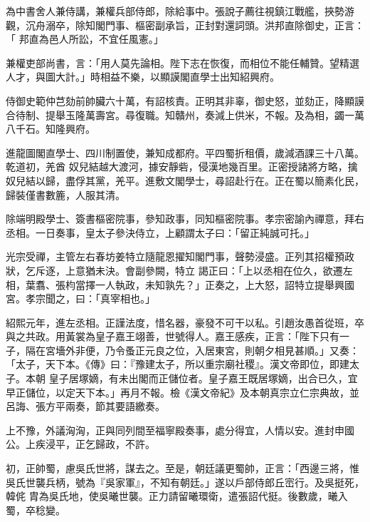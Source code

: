 \begin{pinyinscope}
 為中書舍人兼侍講，兼權兵部侍郎，除給事中。張說子薦往視鎮江戰艦，挾勢游觀，沉舟溺卒，除知閣門事、樞密副承旨，正封對還詞頭。洪邦直除御史，正言：「
 邦直為邑人所訟，不宜任風憲。」



 兼權吏部尚書，言：「用人莫先論相。陛下志在恢復，而相位不能任輔贊。望精選人才，與圖大計。」時相益不樂，以顯謨閣直學士出知紹興府。



 侍御史範仲芑劾前帥臟六十萬，有詔核責。正明其非辜，御史怒，並劾正，降顯謨合待制、提舉玉隆萬壽宮。尋復職。知贛州，奏減上供米，不報。及為相，蠲一萬八千石。知隆興府。



 進龍圖閣直學士、四川制置使，兼知成都府。平四蜀折租價，歲減酒課三十八萬。乾道初，羌酋
 奴兒結越大渡河，據安靜砦，侵漢地幾百里。正密授諸將方略，擒奴兒結以歸，盡俘其黨，羌平。進敷文閣學士，尋詔赴行在。正在蜀以簡素化民，歸裝僅書數簏，人服其清。



 除端明殿學士、簽書樞密院事，參知政事，同知樞密院事。孝宗密諭內禪意，拜右丞相。一日奏事，皇太子參決侍立，上顧謂太子曰：「留正純誠可托。」



 光宗受禪，主管左右春坊姜特立隨龍恩擢知閣門事，聲勢浸盛。正列其招權預政狀，乞斥逐，上意猶未決。會副參闕，特立
 謁正曰：「上以丞相在位久，欲遷左相，葉翥、張枃當擇一人執政，未知孰先？」正奏之，上大怒，詔特立提舉興國宮。孝宗聞之，曰：「真宰相也。」



 紹熙元年，進左丞相。正謹法度，惜名器，豪發不可干以私。引趙汝愚首從班，卒與之共政。用黃裳為皇子嘉王翊善，世號得人。嘉王感疾，正言：「陛下只有一子，隔在宮墻外非便，乃令蚤正元良之位，入居東宮，則朝夕相見甚順。」又奏：「太子，天下本。《傳》曰：『豫建太子，所以重宗廟社稷』。漢文帝即位，即建太子。本朝
 皇子居塚嫡，有未出閣而正儲位者。皇子嘉王既居塚嫡，出合已久，宜早正儲位，以定天下本。」再月不報。檢《漢文帝紀》及本朝真宗立仁宗典故，並呂誨、張方平兩奏，節其要語繳奏。



 上不豫，外議洶洶，正與同列間至福寧殿奏事，處分得宜，人情以安。進封申國公。上疾浸平，正乞歸政，不許。



 初，正帥蜀，慮吳氏世將，謀去之。至是，朝廷議更蜀帥，正言：「西邊三將，惟吳氏世襲兵柄，號為『吳家軍』，不知有朝廷。」遂以戶部侍郎丘崈行。及吳挺死，韓侂
 胄為吳氏地，使吳曦世襲。正力請留曦環衛，遣張詔代挺。後數歲，曦入蜀，卒稔變。




\end{pinyinscope}
